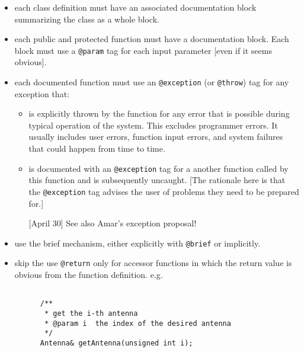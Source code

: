 \documentclass{article}
\begin{document}
%


\begin{itemize}

\item
each class definition must have an associated documentation
block summarizing the class as a whole block.  

\item
each public and protected function must have a documentation
block.  Each block must use a {\tt @param} tag for each input parameter
[even if it seems obvious].

\item
each documented function must use an {\tt @exception} 
(or {\tt @throw}) tag for any exception that: 

  \begin{itemize}
  \item
  is explicitly thrown by the function for any error that is 
  possible during typical operation of the system.  This
  excludes programmer errors.  It usually includes user errors,
  function input errors, and system failures that could happen
  from time to time.
  \item
  is documented with an {\tt @exception} tag for a another function
  called by this function and is subsequently uncaught.  
  [The rationale here is that the {\tt @exception} tag advises the user of 
    problems they need to be prepared for.]

  [April 30] See also Amar's exception proposal!
  \end{itemize}
  
\item
  use the brief mechanism, either explicitly with {\tt @brief} or
  implicitly.  

\item
skip the use {\tt @return} only for accessor functions in which the
return value is obvious from the function definition.  e.g.

\footnotesize
\begin{verbatim}

      /**
       * get the i-th antenna
       * @param i  the index of the desired antenna
       */
      Antenna& getAntenna(unsigned int i);

\end{verbatim}
\normalsize


\end{itemize}
\end{document}
